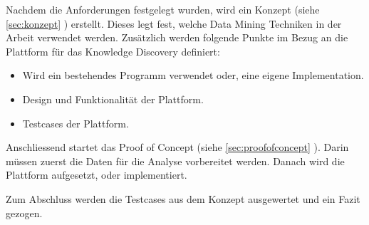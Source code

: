 Nachdem die Anforderungen festgelegt wurden, wird ein Konzept (siehe \cref{sec:konzept} ) erstellt. Dieses legt fest, welche Data Mining Techniken in der Arbeit verwendet werden. Zusätzlich werden folgende Punkte im Bezug an die Plattform für das Knowledge Discovery definiert:
\begin{itemize}
	\item Wird ein bestehendes Programm verwendet oder, eine eigene Implementation.
	\item Design und Funktionalität der Plattform.
	\item Testcases der Plattform.
\end{itemize}

Anschliessend startet das Proof of Concept (siehe \cref{sec:proofofconcept} ). Darin müssen zuerst die Daten für die Analyse vorbereitet werden. Danach wird die Plattform aufgesetzt, oder implementiert.

Zum Abschluss werden die Testcases aus dem Konzept ausgewertet und ein Fazit gezogen.

